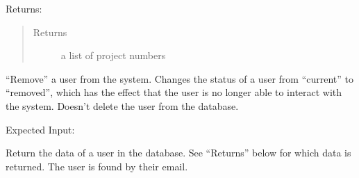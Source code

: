 \documentclass[letterpaper,10pt,english]{sphinxmanual}
\begin{document}
\begin{fulllineitems}
\begin{fulllineitems}
Returns:

\begin{sphinxVerbatim}[commandchars=\\\{\}]
       
\end{sphinxVerbatim}
\begin{quote}\begin{description}
\item[{Returns}] \leavevmode
a list of project numbers

\end{description}\end{quote}

\end{fulllineitems}


\begin{fulllineitems}
\label{\detokenize{apidoc/utdesign_procurement:utdesign_procurement.apigateway.ApiGateway.userRemove}}
“Remove” a user from the system. Changes the
status of a user from “current” to “removed”, which has
the effect that the user is no longer able to interact
with the system. Doesn’t delete the user from the database.

Expected Input:

\begin{sphinxVerbatim}[commandchars=\\\{\}]
     
\end{sphinxVerbatim}

\end{fulllineitems}


\begin{fulllineitems}
\label{\detokenize{apidoc/utdesign_procurement:utdesign_procurement.apigateway.ApiGateway.userSingleData}}
Return the data of a user in the database. See “Returns” below for
which data is returned. The user is found by their email.


\end{fulllineitems}
\end{fulllineitems}
\end{document}
